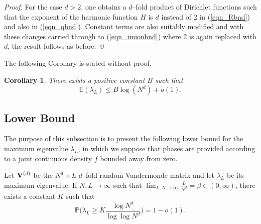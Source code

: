 \documentclass[smallextended]{svjour3}
\newtheorem{cor}{Corollary}
\begin{document}
\begin{proof}
\par For the case $d > 2$, one obtains a $d$--fold product of Dirichlet functions such that the exponent of the harmonic function $H$ is $d$ instead of 2 in (\ref{eqn_Rbnd}) and also in (\ref{eqn_qbnd}). Constant terms are also suitably modified and with these changes carried through to (\ref{eqn_unionbnd}) where 2 is again replaced with $d$, the result follows as before. 
\qed \end{proof}
The following Corollary is stated without proof.
\begin{cor}
There exists a positive constant $B$ such that
$$
\mathbb{E}(\lambda_L) \leq B \log (N^d) + o(1).
$$
\end{cor}

\subsection{Lower Bound}

The purpose of this subsection is to present the following lower bound for the maximum eigenvalue $\lambda_L$,
in which we suppose that phases are provided according to a joint continuous density $f$ bounded away from zero. 

\begin{theorem}
Let ${\bf V}^{(d)}$ be the $N^{d}\times L$ $d$--fold random Vandermonde matrix and let $\lambda_L$ be its maximum eigenvalue. If $N,L \rightarrow \infty$ such that $\lim_{L,N\to\infty}\frac{L}{N^{d}}=\beta\in (0,\infty)$,  
there exists a constant $K$ such that 
\begin{equation}
\mathbb{P}\Big( \lambda_L \geq K\frac{ \log N^d}{ \log \log N^{d}}\Big) = 1 - o(1).
\label{eqn_maxlowbnd}
\end{equation}
\end{theorem}
\end{document}
